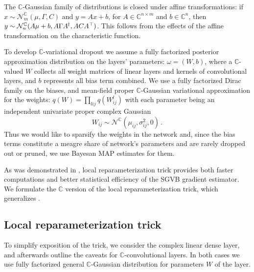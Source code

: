 \documentclass[a4paper,10pt]{article}
\newcommand{\cplx}{\mathbb{C}}
\newcommand{\hop}{{\mkern-1.5mu\dagger}}
\begin{document}
The $\cplx$-Gaussian family of distributions is closed under affine transformations:
if $
  x \sim \mathcal{N}_m^{\cplx}(\mu, \Gamma, C)
$ and $y = A x + b$, for $
  A \in \cplx^{n\times m}
$ and $b \in \cplx^{n}$, then $
  y \sim \mathcal{N}_n^{\cplx}(A\mu + b, A \Gamma A^\hop, A C A^\top)
$. This follows from the effects of the affine transformation on the characteristic
function.

To develop $\cplx$-variational dropout we assume a fully factorized posterior approximation
distribution on the layers' parameters: $\omega = (W, b)$, where a $\cplx$-valued $W$ collects
all weight matrices of linear layers and kernels of convolutional layers, and $b$ represents
all bias term combined. We use a fully factorized Dirac family on the biases, and mean-field
proper $\cplx$-Gaussian variational approximation for the weights: $
  q(W) = \prod_{lij} q(W^{l}_{ij})
$ with each parameter being an independent univariate proper complex Gaussian
\begin{equation} \label{eq:c-gauss-vi}
  W_{ij}
    \sim \mathcal{N}^{\cplx}(\mu_{ij}, \sigma^2_{ij}, 0)
  \,.
\end{equation}
Thus we would like to sparsify the weights in the network and, since the bias terms constitute
a meagre share of network's parameters and are rarely dropped out or pruned, we use Bayesan
MAP estimates for them.

As was demonstrated in \cite{kingma_variational_2015}, local reparameterization trick
provides both faster computations and better statistical efficiency of the SGVB gradient
estimator. We formulate the $\cplx$ version of the local reparameterization trick, which
generalizes \cite{who-dis-originally-22}.


\subsection{Local reparameterization trick} %
\label{sub:local_reparameterization_trick}

To simplify exposition of the trick, we consider the complex linear dense layer, and afterwards
outline the caveats for $\cplx$-convolutional layers. In both cases we use fully factorized
general $\cplx$-Gaussian distribution for parameters $W$ of the layer.
\end{document}
